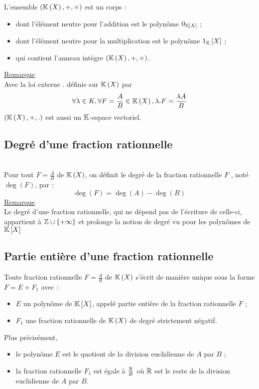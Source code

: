 \begin{defprop}
    L’ensemble \(\left(\mathbb{K}\left(X\right), +, \times \right)\) est un corps :
    \begin{itemize}
        \item dont l’élément neutre pour l’addition est le polynôme \(0_{\mathbb{K}\left[X\right]}\) ;
        \item dont l’élément neutre pour la multiplication est le polynôme \(1_{\mathbb{K}}\left[X\right]\) ;
        \item qui contient l’anneau intègre \(\left(\mathbb{K}\left(X\right), +, \times \right)\).
    \end{itemize}
    \underline{Remarque}\\
    Avec la loi externe \(.\) définie sur \(\mathbb{K}\left(X\right)\) par
    \[\forall \lambda  \in K, \forall F = \frac{A}{B} \in \mathbb{K}\left(X\right), \lambda.F = \frac{\lambda A}{B}\]
    \(\left(\mathbb{K}\left(X\right), +, . \right)\) est aussi un \(\mathbb{K}\)-espace vectoriel.
\end{defprop}

\subsection{Degré d’une fraction rationnelle}
\begin{defprop}
    ~\\
    Pour tout \(F = \frac{A}{B}\) de \(\mathbb{K}\left(X\right)\), on définit le degré de la fraction rationnelle \(F\) , noté \(\deg(F )\), par :
    \[\deg(F ) = \deg(A) - \deg(B)\]
    \underline{Remarque} \\
    Le degré d’une fraction rationnelle, qui ne dépend pas de l’écriture de celle-ci, appartient à \(\mathbb{Z} \cup \left\lbrace+\infty\right\rbrace\) et prolonge la notion de degré vu pour les polynômes de \(\mathbb{K} \left[X\right]\) 
\end{defprop}
\subsection{Partie entière d’une fraction rationnelle}
\begin{defprop}
    Toute fraction rationnelle \(F = \frac{A}{B}\) de \(\mathbb{K}\left(X\right)\) s’écrit de manière unique sous la forme \(F = E + F_1\) avec :
    \begin{itemize}
        \item \(E\) un polynôme de \(\mathbb{K}\left[X\right]\), appelé partie entière de la fraction rationnelle \(F\) ;
        \item \(F_1\) une fraction rationnelle de \(\mathbb{K}\left(X\right)\) de degré strictement négatif.
    \end{itemize}
    Plus précisément,
    \begin{itemize}
        \item le polynôme \(E\) est le quotient de la division euclidienne de \(A\) par \(B\) ;
        \item la fraction rationnelle \(F_1\) est égale à \(\frac{\mathbb{R}}{B}\) où \(\mathbb{R}\) est le reste de la division euclidienne de \(A\) par \(B\).
    \end{itemize}
    
\end{defprop}
